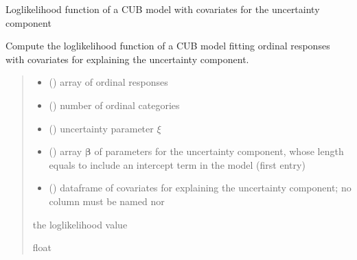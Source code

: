 \documentclass[letterpaper,10pt,english]{sphinxmanual}
\begin{document}

\begin{fulllineitems}
\label{\detokenize{cubmods:cubmods.cub_y0.loglik}}
\pysigstartsignatures
{}
\pysigstopsignatures
\sphinxAtStartPar
Log\sphinxhyphen{}likelihood function of a CUB model with covariates for the uncertainty component

\sphinxAtStartPar
Compute the log\sphinxhyphen{}likelihood function of a CUB model fitting ordinal responses with covariates 
for explaining the uncertainty component.
\begin{quote}\begin{description}
\begin{itemize}
\item {} 
\sphinxAtStartPar
{} () \textendash{} array of ordinal responses

\item {} 
\sphinxAtStartPar
{} () \textendash{} number of ordinal categories

\item {} 
\sphinxAtStartPar
{} () \textendash{} uncertainty parameter \(\xi\)

\item {} 
\sphinxAtStartPar
{} () \textendash{} array \(\pmb \beta\) of parameters for the uncertainty component, whose length equals 
 to include an intercept term in the model (first entry)

\item {} 
\sphinxAtStartPar
{} () \textendash{} dataframe of covariates for explaining the uncertainty component;
no column must be named  nor 

\end{itemize}

\sphinxAtStartPar
the log\sphinxhyphen{}likelihood value

\sphinxAtStartPar
float

\end{description}\end{quote}

\end{fulllineitems}
\end{document}
